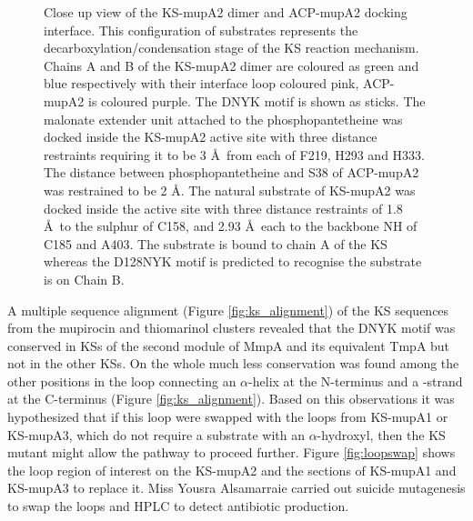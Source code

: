 		\setlength\fboxsep{5pt}
		\setlength\fboxrule{1.5pt}
		\begin{figure}[htbp]
		\centering
		\caption[Close up view of the KS-mupA2 dimer and ACP-mupA2 docking interface.]{Close up view of the KS-mupA2 dimer and ACP-mupA2 docking interface. This configuration of substrates represents the decarboxylation/condensation stage of the KS reaction mechanism. Chains A and B of the KS-mupA2 dimer are coloured as green and blue respectively with their interface loop coloured pink, ACP-mupA2 is coloured purple. The DNYK motif is shown as sticks. The malonate extender unit attached to the phosphopantetheine was docked inside the KS-mupA2 active site with three distance restraints requiring it to be 3 \AA \ from each of F219, H293 and H333. The distance between phosphopantetheine and S38 of ACP-mupA2 was restrained to be 2 \AA. The natural substrate of KS-mupA2 was docked inside the active site with three distance restraints of 1.8 \AA \ to the sulphur of C158, and 2.93 \AA \ each to the backbone NH of C185 and A403. The substrate is bound to chain A of the KS whereas the D128NYK motif is predicted to recognise the substrate is on Chain B.}
		\label{fig:closeuploop}
		\end{figure}		
	
	A multiple sequence alignment (Figure \ref{fig:ks_alignment}) of the KS sequences from the mupirocin and thiomarinol clusters revealed that the DNYK motif was conserved in KSs of the second module of MmpA and its equivalent TmpA but not in the other KSs. On the whole much less conservation was found among the other positions in the loop connecting an $ \alpha $-helix at the N-terminus and a \bet-strand at the C-terminus (Figure \ref{fig:ks_alignment}). Based on this observations it was hypothesized that if this loop were swapped with the loops from KS-mupA1 or KS-mupA3, which do not require a substrate with an $ \alpha $-hydroxyl, then the KS mutant might allow the pathway to proceed further. Figure \ref{fig:loopswap} shows the loop region of interest on the KS-mupA2 and the sections of KS-mupA1 and KS-mupA3 to replace it. Miss Yousra Alsamarraie carried out suicide mutagenesis to swap the loops and HPLC to detect antibiotic production.   

